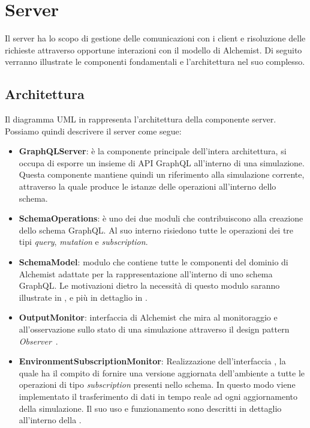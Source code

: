 \section{Server}\label{sec:server}
Il server ha lo scopo di gestione delle comunicazioni con i client e risoluzione delle richieste attraverso opportune interazioni con il modello
di Alchemist. Di seguito verranno illustrate le componenti fondamentali e l'architettura nel suo complesso.
%

\subsection{Architettura}\label{ssec:server-arch}
Il diagramma UML in  rappresenta l'architettura della componente server.
Possiamo quindi descrivere il server come segue:
\begin{itemize}
    \item \textbf{GraphQLServer}: è la componente principale dell'intera architettura, si occupa di esporre un insieme di API GraphQL all'interno di una simulazione.
        Questa componente mantiene quindi un riferimento alla simulazione corrente, attraverso la quale produce le istanze delle operazioni all'interno dello schema.
    \item \textbf{SchemaOperations}: è uno dei due moduli che contribuiscono alla creazione dello schema GraphQL. Al suo interno risiedono tutte le operazioni dei tre tipi \textit{query},
        \textit{mutation} e \textit{subscription}.
    \item \textbf{SchemaModel}: modulo che contiene tutte le componenti del dominio di Alchemist adattate per la rappresentazione all'interno di uno schema GraphQL. Le motivazioni dietro 
        la necessità di questo modulo saranno illustrate in , e più in dettaglio in .
    \item \textbf{OutputMonitor}: interfaccia di Alchemist che mira al monitoraggio e all'osservazione sullo stato di una simulazione attraverso il design pattern \textit{Observer}~\cite{design-patterns}.
    \item \textbf{EnvironmentSubscriptionMonitor}: Realizzazione dell'interfaccia , la quale ha il compito di fornire una versione aggiornata dell'ambiente a tutte le operazioni
        di tipo \textit{subscription} presenti nello schema. In questo modo viene implementato il trasferimento di dati in tempo reale ad ogni aggiornamento della simulazione. Il suo uso e funzionamento
        sono descritti in dettaglio all'interno della .
\end{itemize}


